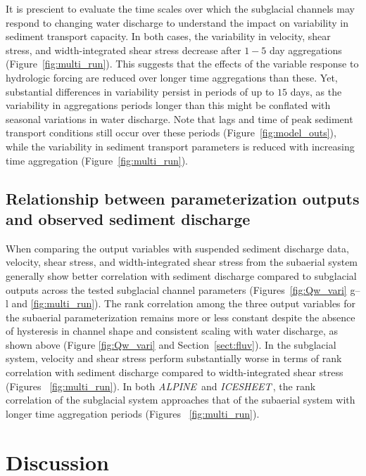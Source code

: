 \documentclass[11pt]{article}
\newcommand{\alpine}{\textit{ALPINE}\,}
\newcommand{\icesheet}{\textit{ICESHEET}\,}
\begin{document}
It is prescient to evaluate the time scales over which the subglacial channels may respond to changing water discharge to understand the impact on variability in sediment transport capacity.
In both cases, the variability in velocity, shear stress, and width-integrated shear stress decrease after $1-5$ day aggregations (Figure~\ref{fig:multi_run}).
This suggests that the effects of the variable response to hydrologic forcing are reduced over longer time aggregations than these.
Yet, substantial differences in variability persist in periods of up to $15$ days, as the variability in aggregations periods longer than this might be conflated with seasonal variations in water discharge.
Note that lags and time of peak sediment transport conditions still occur over these periods (Figure~\ref{fig:model_outs}), while the variability in sediment transport parameters is reduced with increasing time aggregation (Figure~\ref{fig:multi_run}).

\subsection{Relationship between parameterization  outputs and observed sediment discharge}
When comparing the output variables with suspended sediment discharge data, velocity, shear stress, and width-integrated shear stress from the subaerial system generally show better correlation with sediment discharge compared to subglacial outputs across the tested subglacial channel parameters (Figures~\ref{fig:Qw_vari} g--l and \ref{fig:multi_run}).
The rank correlation among the three output variables for the subaerial parameterization remains more or less constant despite the absence of hysteresis in channel shape and consistent scaling with water discharge, as shown above (Figure \ref{fig:Qw_vari} and Section~\ref{sect:fluv}).
In the subglacial system, velocity and shear stress perform substantially worse in terms of rank correlation with sediment discharge compared to width-integrated shear stress (Figures~ \ref{fig:multi_run}).
In both \alpine{} and \icesheet{}, the rank correlation of the subglacial system approaches that of the subaerial system with longer time aggregation periods (Figures~ \ref{fig:multi_run}).


\section{Discussion}
\end{document}
